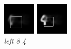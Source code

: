 \documentclass{article} %
\begin{document}
\begin{figure}[t]
  \includegraphics[width=\linewidth]{figures/4-8-4.png}
  \caption{\textit{left 8 4}}
\endminipage\hfill
{}
  \includegraphics[width=\linewidth]{figures/4-8-6.png}

\end{figure}
\end{document}
